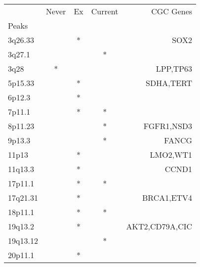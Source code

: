 \begin{tabular}{lcccr}
\toprule
{} & Never & Ex & Current &       CGC Genes \\
Peaks    &       &    &         &                 \\
\midrule
3q26.33  &       &  * &         &            SOX2 \\
3q27.1   &       &    &       * &                 \\
3q28     &     * &    &         &        LPP,TP63 \\
5p15.33  &       &  * &         &       SDHA,TERT \\
6p12.3   &       &  * &         &                 \\
7p11.1   &       &  * &       * &                 \\
8p11.23  &       &    &       * &      FGFR1,NSD3 \\
9p13.3   &       &    &       * &           FANCG \\
11p13    &       &  * &         &        LMO2,WT1 \\
11q13.3  &       &  * &         &           CCND1 \\
17p11.1  &       &  * &       * &                 \\
17q21.31 &       &  * &         &      BRCA1,ETV4 \\
18p11.1  &       &  * &       * &                 \\
19q13.2  &       &  * &         &  AKT2,CD79A,CIC \\
19q13.12 &       &    &       * &                 \\
20p11.1  &       &  * &         &                 \\
\bottomrule
\end{tabular}
